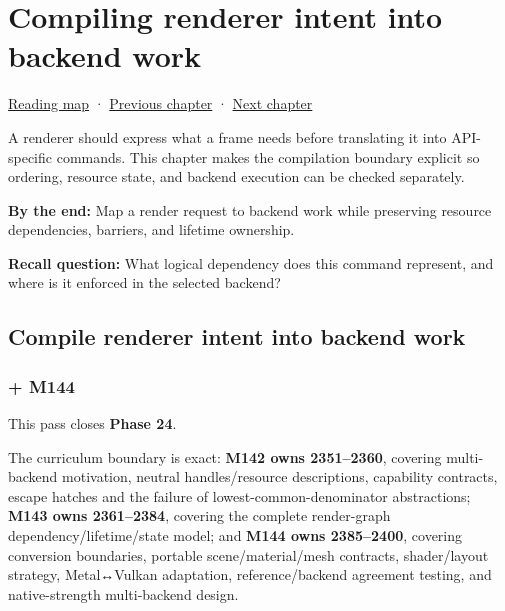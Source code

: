 \chapter{Compiling renderer intent into backend work}\label{06-engine-ii-ch043-compiling-renderer-intent-into-backend-work}\hypertarget{06-engine-ii-ch043}{}\label{stagechapter:06-engine-ii-ch043}

\hypertarget{06-engine-ii-ch043-compiling-renderer-intent-into-backend-work}{}

\hyperref[volume-reading-map]{Reading map} · \hyperref[06-engine-ii-ch027]{Previous chapter} · \hyperref[06-engine-ii-ch044-cross-backend-conversion-and-agreement]{Next chapter}

A renderer should express what a frame needs before translating it into API-specific commands. This chapter makes the compilation boundary explicit so ordering, resource state, and backend execution can be checked separately.

\textbf{By the end:} Map a render request to backend work while preserving resource dependencies, barriers, and lifetime ownership.

\textbf{Recall question:} What logical dependency does this command represent, and where is it enforced in the selected backend?

\section{Compile renderer intent into backend work}\label{06-engine-ii-ch043-compile-renderer-intent-into-backend-work}

\hypertarget{06-engine-ii-ch043-compile-renderer-intent-into-backend-work}{}

\subsection{+ M144}\label{06-engine-ii-ch043-m144}

\hypertarget{06-engine-ii-ch043-m144}{}

This pass closes \textbf{Phase 24}.

The curriculum boundary is exact: \textbf{M142 owns 2351--2360}, covering multi-backend motivation, neutral handles/resource descriptions, capability contracts, escape hatches and the failure of lowest-common-denominator abstractions; \textbf{M143 owns 2361--2384}, covering the complete render-graph dependency/lifetime/state model; and \textbf{M144 owns 2385--2400}, covering conversion boundaries, portable scene/material/mesh contracts, shader/layout strategy, Metal↔Vulkan adaptation, reference/backend agreement testing, and native-strength multi-backend design.

